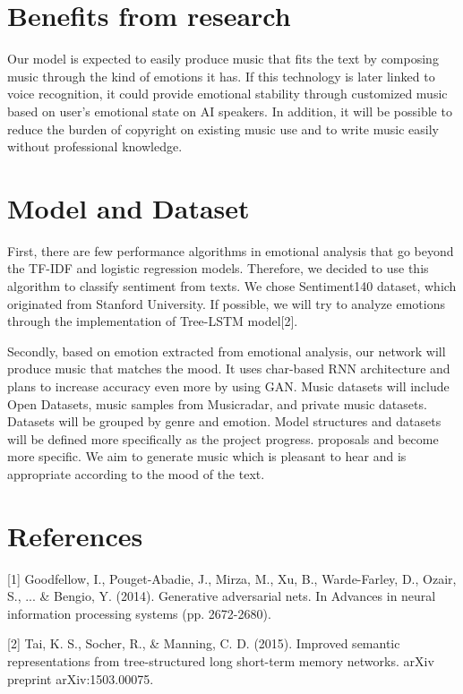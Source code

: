 \documentclass{article}
\begin{document}
\section{Benefits from research}

Our model is expected to easily produce music that fits the text by composing music through the kind of emotions it has. If this technology is later linked to voice recognition, it could provide emotional stability through customized music based on user's emotional state on AI speakers. In addition, it will be possible to reduce the burden of copyright on existing music use and to write music easily without professional knowledge.

\section{Model and Dataset}

First, there are few performance algorithms in emotional analysis that go beyond the TF-IDF and logistic regression models. Therefore, we decided to use this algorithm to classify sentiment from texts. We chose Sentiment140 dataset, which originated from Stanford University. If possible, we will try to analyze emotions through the implementation of Tree-LSTM model[2].

Secondly, based on emotion extracted from emotional analysis, our network will produce music that matches the mood. It uses char-based RNN architecture and plans to increase accuracy even more by using GAN. Music datasets will include Open Datasets, music samples from Musicradar, and private music datasets. Datasets will be grouped by genre and emotion. Model structures and datasets will be defined more specifically as the project progress. proposals and become more specific. We aim to generate music which is pleasant to hear and is appropriate according to the mood of the text.

\section*{References}

\small
[1] Goodfellow, I., Pouget-Abadie, J., Mirza, M., Xu, B., Warde-Farley, D., Ozair, S., ... & Bengio, Y. (2014). Generative adversarial nets. In Advances in neural information processing systems (pp. 2672-2680).

[2] Tai, K. S., Socher, R., & Manning, C. D. (2015). Improved semantic representations from tree-structured long short-term memory networks. arXiv preprint arXiv:1503.00075.
\end{document}
